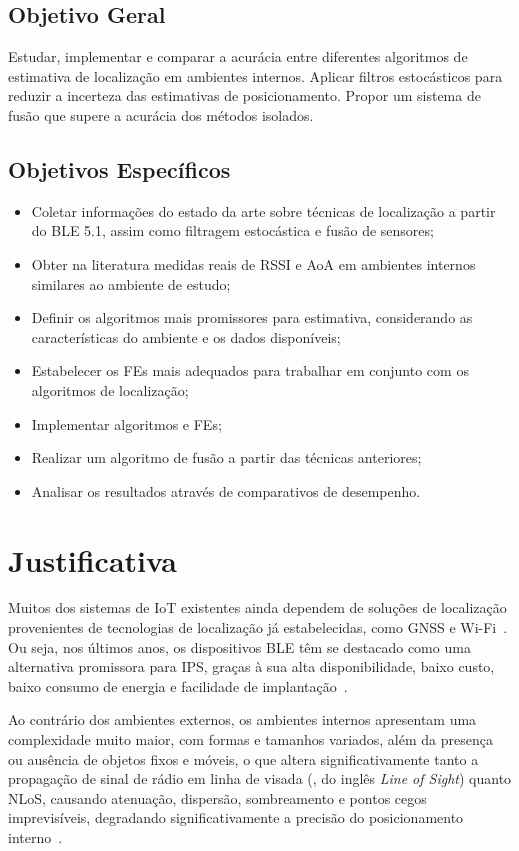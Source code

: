 \subsection{Objetivo Geral}
\label{subsec:objetivoGeral}
Estudar, implementar e comparar a acurácia entre diferentes algoritmos de estimativa de localização em ambientes internos. Aplicar filtros estocásticos para reduzir a incerteza das estimativas de posicionamento. Propor um sistema de fusão que supere a acurácia dos métodos isolados.

\subsection{Objetivos Específicos}
\label{subsec:objetivosEspecificos}
\begin{itemize}
    \item  Coletar informações do estado da arte sobre técnicas de localização a partir do BLE 5.1, assim como filtragem estocástica e fusão de sensores;
    \item Obter na literatura medidas reais de RSSI e AoA em ambientes internos similares ao ambiente de estudo;
    \item Definir os algoritmos mais promissores para estimativa, considerando as características do ambiente e os dados disponíveis;
    \item Estabelecer os FEs mais adequados para trabalhar em conjunto com os algoritmos de localização;
    \item Implementar algoritmos e FEs;
    \item Realizar um algoritmo de fusão a partir das técnicas anteriores;
    \item Analisar os resultados através de comparativos de desempenho.
\end{itemize}


\section{Justificativa}
\label{sec:justificativa}

Muitos dos sistemas de IoT existentes ainda dependem de soluções de localização provenientes de tecnologias de localização já estabelecidas, como GNSS e Wi-Fi~\cite{Li2021}. Ou seja, nos últimos anos, os dispositivos BLE têm se destacado como uma alternativa promissora para IPS, graças à sua alta disponibilidade, baixo custo, baixo consumo de energia e facilidade de implantação~\cite{Mackey2020}.

Ao contrário dos ambientes externos, os ambientes internos apresentam uma complexidade muito maior, com formas e tamanhos variados, além da presença ou ausência de objetos fixos e móveis, o que altera significativamente tanto a propagação de sinal de rádio em linha de visada (, do inglês \textit{Line of Sight}) quanto NLoS, causando atenuação, dispersão, sombreamento e pontos cegos imprevisíveis, degradando significativamente a precisão do posicionamento interno~\cite{Nessa2020}.

